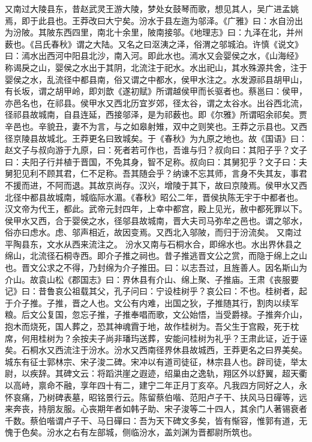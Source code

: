 \documentclass[12pt,UTF8]{ctexbook}
\begin{document}
又南过大陵县东，昔赵武灵王游大陵，梦处女鼓琴而歌，想见其人，吴广进孟姚焉，即于此县也。王莽改曰大宁矣。汾水于县左迤为邬泽。《广雅》曰：水自汾出为汾陂。其陂东西四里，南北十余里，陂南接邬。《地理志》曰：九泽在北，并州薮也。《吕氏春秋》谓之大陆。又名之曰沤洟之泽，俗渭之邬城泊。许慎《说文》曰：漹水出西河中阳县北沙，南入河。即此水也。漹水又会婴侯之水，《山海经》称谒戾之山，婴侯之水出于其阴，北流注于祀水。水出祀山，其水殊源共舍，注于婴侯之水，乱流径中都县南，俗又谓之中都水，侯甲水注之。水发源祁县胡甲山，有长坂，谓之胡甲岭，即刘歆《遂初赋》所谓越侯甲而长驱者也。蔡邕曰：侯甲，亦邑名也，在祁县。侯甲水又西北历宜岁郊，径太谷，谓之太谷水。出谷西北流，径祁县故城南，自县连延，西接邬泽，是为祁薮也。即《尔雅》所谓昭余祁矣。贾辛邑也。辛貌丑，妻不为言，与之如皋射雉，双中之则笑也。王莽之示县也。又西径京陵县故城北。王莽更名曰致城矣。于《春秋》为九原之地也。故《国语》曰：赵文子与叔向游于九原，曰：死者若可作也，吾谁与归？叔向曰：其阳子乎？文子曰：夫阳子行并植于晋国，不免其身，智不足称。叔向曰：其舅犯乎？文子曰：夫舅犯见利不顾其君，仁不足称。吾其随会乎？纳谏不忘其师，言身不失其友，事君不援而进，不阿而退。其故京尚存。汉兴，增陵于其下，故曰京陵焉。侯甲水又西北径中都县故城南，城临际水湄。《春秋》昭公二年，晋侯执陈无宇于中都者也。汉文帝为代王，都此。武帝元封四年，上幸中都宫，殿上见光，赦中都死罪以下。侯甲水又西，合于婴侯之水，径邬县故城南，晋大夫司马弥牟之邑也。谓之邬水，俗亦曰虑水。虑、邬声相近，故因变焉。又西北入邬陂，而归于汾流矣。
又南过平陶县东，文水从西来流注之。
汾水又南与石桐水合，即绵水也。水出界休县之绵山，北流径石桐寺西。即介子推之祠也。昔子推逃晋文公之赏，而隐于绵上之山也。晋文公求之不得，乃封绵为介子推田。曰：以志吾过，且旌善人。因名斯山为介山。故袁山松《郡国志》曰：界休县有介山、绵上聚、子推庙。王肃《丧服要记》曰：昔鲁哀公祖载其父，孔子问曰：宁设桂树乎？哀公曰：不也。桂树者，起于介子推。子推，晋之人也。文公有内难，出国之狄，子推随其行，割肉以续军粮。后文公复国，忽忘子推，子推奉唱而歌，文公始悟，当受爵禄。子推奔介山，抱木而烧死，国人葬之，恐其神魂霣于地，故作桂树为。吾父生于宫殿，死于枕席，何用桂树为？余按夫子尚非璠玙送葬，安能问桂树为礼乎？王肃此证，近于诬矣。石桐水又西流注于汾水。汾水又西南径界休县故城西，王莽更名之曰界美矣。城东有征士郭林宗、宋子浚二碑。宋冲以有道司徒征，林宗县人也。辟司徒，举太尉，以疾辞。其碑文云：将蹈洪崖之遐迹，绍巢由之逸轨，翔区外以舒翼，超天衢以高峙，禀命不融，享年四十有二，建宁二年正月丁亥卒。凡我四方同好之人，永怀哀痛，乃树碑表墓，昭铭景行云。陈留蔡伯喈、范阳卢子干、扶风马日磾等，远来奔丧，持朋友服。心丧期年者如韩子助、宋子浚等二十四人，其余门人著锡衰者千数。蔡伯喈谓卢子干、马日磾曰：吾为天下碑文多矣，皆有惭容，惟郭有道，无愧于色矣。汾水之右有左部城，侧临汾水，盖刘渊为晋都尉所筑也。
\end{document}
